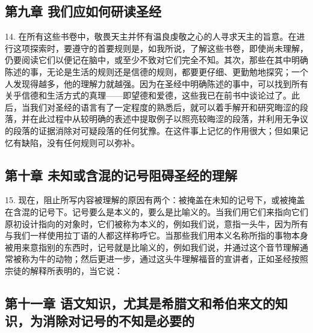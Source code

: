 \subsection{第九章 我们应如何研读圣经}

14. 在所有这些书卷中，敬畏天主并怀有温良虔敬之心的人寻求天主的旨意。在进行这项探索时，要遵守的首要规则是，如我所说，了解这些书卷，即使尚未理解，仍要阅读它们以便记在脑中，或至少不致对它们完全不知。其次，那些在其中明确陈述的事，无论是生活的规则还是信德的规则，都要更仔细、更勤勉地探究；一个人发现得越多，他的理解力就越强。因为在圣经中明确陈述的事中，可以找到所有关乎信德和生活方式的真理——即望德和爱德，这些我已在前书中谈论过了。此后，当我们对圣经的语言有了一定程度的熟悉后，就可以着手解开和研究晦涩的段落，并在此过程中从较明确的表述中提取例子以照亮较晦涩的段落，并利用无争议的段落的证据消除对可疑段落的任何犹豫。在这件事上记忆的作用很大；但如果记忆有缺陷，没有任何规则可以弥补。\par


\subsection{第十章 未知或含混的记号阻碍圣经的理解}

15. 现在，阻止所写内容被理解的原因有两个：被掩盖在未知的记号下，或被掩盖在含混的记号下。记号要么是本义的，要么是比喻义的。当我们用它们来指向它们原初设计指向的对象时，它们被称为本义的，例如我们说，意指一头牛，因为所有与我们一样使用拉丁语的人都这样称呼它。当那些我们用本义名称所指的事物本身被用来意指别的东西时，记号就是比喻义的，例如我们说，并通过这个音节理解通常被称为牛的动物；然后更进一步，通过这头牛理解福音的宣讲者，正如圣经按照宗徒的解释所表明的，当它说：\par


\subsection{第十一章 语文知识，尤其是希腊文和希伯来文的知识，为消除对记号的不知是必要的}

